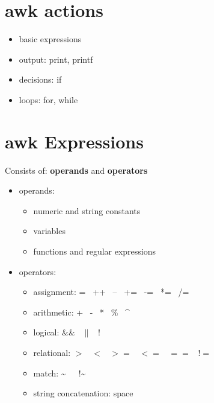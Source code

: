 \documentclass{report}
\begin{document}
\section{awk actions}
\begin{itemize}
  \item basic expressions 
  \item output: print, printf
  \item decisions: if
  \item loops: for, while
\end{itemize}
\section{awk Expressions}
Consists of: \textbf{operands} and \textbf{operators} 
\begin{itemize}
  \item operands:
    \begin{itemize}[label=$\bullet$]
      \item numeric and string constants 
      \item variables
      \item functions and regular expressions
    \end{itemize}
  \item operators:
    \begin{itemize}[label=$\bullet$]
      \item assignment: = \ ++ \ -- \ += \ -= \ *= \ /=
      \item arithmetic: + \ - \ * \ \% \ \textasciicircum
      \item logical: \&\& \ $\|$ \ !
      \item relational: $>$ \ $<$ \ $>=$ \ $<=$ \ $==$ \ $!=$
      \item match: \textasciitilde \ \ \ !\textasciitilde
      \item string concatenation: space
    \end{itemize}
\end{itemize}
\end{document}

